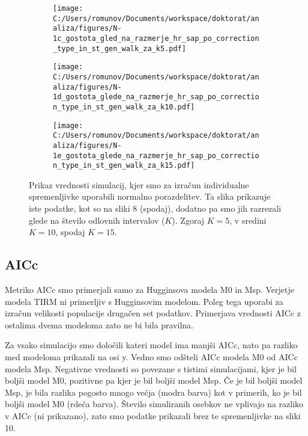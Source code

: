\begin{figure}[H]
  \ContinuedFloat
  \centering
  \begin{subfigure}[b]{1\textwidth}
    \centering
    \texttt{[image: C:/Users/romunov/Documents/workspace/doktorat/analiza/figures/N-1c\_gostota\_gled\_na\_razmerje\_hr\_sap\_po\_correction\_type\_in\_st\_gen\_walk\_za\_k5.pdf]}
    \label{sli:sub9.1}
  \end{subfigure}

  \begin{subfigure}[b]{1\textwidth}
    \centering
    \texttt{[image: C:/Users/romunov/Documents/workspace/doktorat/analiza/figures/N-1d\_gostota\_glede\_na\_razmerje\_hr\_sap\_po\_correction\_type\_in\_st\_gen\_walk\_za\_k10.pdf]}
    \label{sli:sub9.2}
  \end{subfigure}
\end{figure}

\begin{figure}[H]
  \ContinuedFloat
  \begin{subfigure}[b]{1\textwidth}
    \centering
    \texttt{[image: C:/Users/romunov/Documents/workspace/doktorat/analiza/figures/N-1e\_gostota\_glede\_na\_razmerje\_hr\_sap\_po\_correction\_type\_in\_st\_gen\_walk\_za\_k15.pdf]}
    \label{sli:sub9.3}
  \end{subfigure}
  \caption[Prikaz vrednosti simulacij, kjer smo za izračun individualne spremenljivke uporabili normalno porazdelitev]{Prikaz vrednosti simulacij, kjer smo za izračun individualne spremenljivke uporabili normalno porazdelitev. Ta slika prikazuje iste podatke, kot so na sliki 8 (spodaj), dodatno pa smo jih razrezali glede na število odlovnih intervalov ($K$). Zgoraj $K=5$, v sredini $K=10$, spodaj $K=15$.}
  \label{sli:slika9}
\end{figure}

\subsection{AICc}
Metriko AICc smo primerjali samo za Hugginsova modela M0 in Msp. Verjetje modela TIRM ni primerljiv s Hugginsovim modelom. Poleg tega uporabi za izračun velikosti populacije drugačen set podatkov. Primerjava vrednosti AICc z ostalima dvema modeloma zato ne bi bila pravilna.

Za vsako simulacijo smo določili kateri model ima manjši AICc, nato pa razliko med modeloma prikazali na osi y. Vedno smo odšteli AICc modela M0 od AICc modela Msp. Negativne vrednosti so povezane s tistimi simulacijami, kjer je bil boljši model M0, pozitivne pa kjer je bil boljši model Msp. Če je bil boljši model Msp, je bila razlika pogosto mnogo večja (modra barva) kot v primerih, ko je bil boljši model M0 (rdeča barva). Število simuliranih osebkov ne vplivajo na razliko v AICc (ni prikazano), zato smo podatke prikazali brez te spremenljivke na sliki 10.

